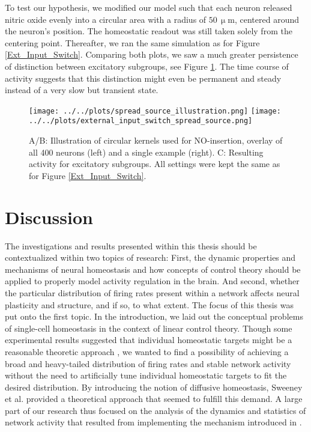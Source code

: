\documentclass[10pt,a4paper]{article}
\begin{document}
To test our hypothesis, we modified our model such that each neuron released nitric oxide evenly into a circular area with a radius of $\mathrm{50 \, \upmu m}$, centered around the neuron's position. The homeostatic readout was still taken solely from the centering point. Thereafter, we ran the same simulation as for Figure \ref{Ext_Input_Switch}. Comparing both plots, we saw a much greater persistence of distinction between excitatory subgroups, see Figure \ref{External_Input_Switch_Spread_Source}. The time course of activity suggests that this distinction might even be permanent and steady instead of a very slow but transient state.
\begin{figure}
\begin{center}
\texttt{[image: ../../plots/spread\_source\_illustration.png]}
\texttt{[image: ../../plots/external\_input\_switch\_spread\_source.png]}
\caption[A/B: Illustration of circular kernels used for NO-insertion, overlay of all 400 neurons and a single example. C: Resulting activity for excitatory subgroups]{A/B: Illustration of circular kernels used for NO-insertion, overlay of all 400 neurons (left) and a single example (right). C: Resulting activity for excitatory subgroups. All settings were kept the same as for Figure \ref{Ext_Input_Switch}.}
\end{center}
\label{External_Input_Switch_Spread_Source}
\end{figure}

\clearpage

\section{Discussion}
The investigations and results presented within this thesis should be contextualized within two topics of research: First, the dynamic properties and mechanisms of neural homeostasis and how concepts of control theory should be applied to properly model activity regulation in the brain. And second, whether the particular distribution of firing rates present within a network affects neural plasticity and structure, and if so, to what extent. The focus of this thesis was put onto the first topic. In the introduction, we laid out the conceptual problems of single-cell homeostasis in the context of linear control theory. Though some experimental results suggested that individual homeostatic targets might be a reasonable theoretic approach \cite{OConnor_2010,Mizuseki_2013,Hengen_2016}, we wanted to find a possibility of achieving a broad and heavy-tailed distribution of firing rates and stable network activity without the need to artificially tune individual homeostatic targets to fit the desired distribution. By introducing the notion of diffusive homeostasis, Sweeney et al. provided a theoretical approach that seemed to fulfill this demand. A large part of our research thus focused on the analysis of the dynamics and statistics of network activity that resulted from implementing the mechanism introduced in \cite{Sweeney_Paper}.
\end{document}
